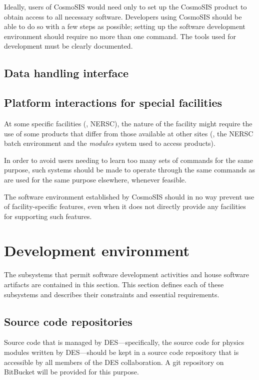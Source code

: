 \documentclass[draftmode,draftwater]{memarticle}
\begin{document}
Ideally, users of CosmoSIS would need only to set up the CosmoSIS
product to obtain access to all necessary software. Developers using
CosmoSIS should be able to do so with a few steps as possible; setting
up the software development environment should require no more than one
command. The tools used for development must be clearly documented.

\subsection{Data handling interface}


\subsection{Platform interactions for special facilities}

At some specific facilities (\eg, NERSC), the nature of the facility
might require the use of some products that differ from those available
at other sites (\eg, the NERSC batch environment and the \emph{modules}
system used to access products).

In order to avoid users needing to learn too many sets of commands for
the same purpose, such systems should be made to operate through the
same commands as are used for the same purpose elsewhere, whenever
feasible.

The software environment established by CosmoSIS should in no way
prevent use of facility-specific features, even when it does not
directly provide any facilities for supporting such features.

\section{Development environment}

The subsystems that permit software development activities and house
software artifacts are contained in this section. This section defines
each of these subsystems and describes their constraints and essential
requirements.

\subsection{Source code repositories}

Source code that is managed by DES---specifically, the source code for
physics modules written by DES---should be kept in a source code
repository that is accessible by all members of the DES collaboration. A
git repository on BitBucket will be provided for this purpose.
\end{document}
